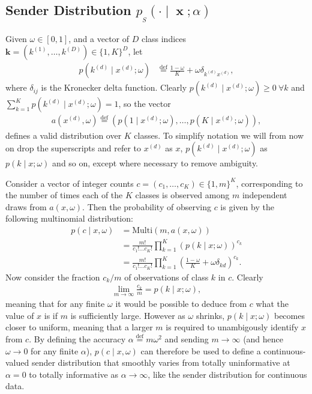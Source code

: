 \documentclass[11pt,table]{article}
\DeclareMathOperator{\x}{\mathbf{x}}
\renewcommand{\k}{\mathbf{k}}
\newcommand*{\defeq}{\stackrel{\text{def}}{=}}
\newcommand{\didx}[2]{#1^{(#2)}}
\newcommand{\0}[1]{\constvec{0}{#1}}
\newcommand{\1}[1]{\constvec{1}{#1}}
\newcommand{\ds}[1]{\{1,#1\}}
\newcommand{\dsd}[2]{\ds{#1}^{#2}}
\newcommand{\sender}[2]{p_{_S}\left(#1 \mid #2\right)}
\begin{document}
\subsection{Sender Distribution \texorpdfstring{$\sender{\cdot}{\x; \alpha}$}{}}\label{sec:disc_sender}
Given $\omega \in [0,1]$, and a vector of $D$ class indices $\k = \left(\didx{k}{1},\dots,\didx{k}{D}\right) \in \dsd{K}{D}$, let
\begin{align}
p(\didx{k}{d} \mid \didx{x}{d}; \omega) &\defeq \frac{1-\omega}{K} + \omega \delta_{\didx{k}{d} \didx{x}{d}}\label{q_def},
\end{align}
where $\delta_{i j}$ is the Kronecker delta function.
Clearly $p(\didx{k}{d} \mid \didx{x}{d}; \omega) \geq 0\ \forall k$ and $\sum_{k=1}^K p(\didx{k}{d} \mid \didx{x}{d}; \omega) = 1$, so the vector
\begin{align}
a(\didx{x}{d}, \omega) \defeq \left(p(1 \mid \didx{x}{d}; \omega),\dots,p(K \mid \didx{x}{d}; \omega)\right),
\end{align}
defines a valid distribution over $K$ classes.
To simplify notation we will from now on drop the superscripts and refer to $\didx{x}{d}$ as $x$, $p(\didx{k}{d} \mid \didx{x}{d}; \omega)$ as $p(k \mid x; \omega)$ and so on, except where necessary to remove ambiguity.

Consider a vector of integer counts $c = (c_1,\dots,c_K) \in \dsd{m}{K}$, corresponding to the number of times each of the $K$ classes is observed among $m$ independent draws from $a(x, \omega)$.
Then the probability of observing $c$ is given by the following multinomial distribution:
\begin{align}
p(c \mid x, \omega) &= \text{Multi}(m, a(x, \omega))\label{multi_def}\\
&= \frac{m!}{c_1!\dots c_K!} \prod_{k=1}^K \left(p(k \mid x; \omega)\right)^{c_k}\\
&= \frac{m!}{c_1!\dots c_K!} \prod_{k=1}^K \left(\frac{1-\omega}{K} + \omega\delta_{k d}\right)^{c_k}.\label{count_dist}
\end{align}
Now consider the fraction $c_k/m$ of observations of class $k$ in $c$.
Clearly
\begin{align}
\lim_{m\rightarrow \infty} \frac{c_k}{m} = p(k \mid x; \omega),
\end{align}
meaning that for any finite $\omega$ it would be possible to deduce from $c$ what the value of $x$ is if $m$ is sufficiently large.
However as $\omega$ shrinks, $p(k \mid x; \omega)$ becomes closer to uniform, meaning that a larger $m$ is required to unambigously identify $x$ from $c$. 
By defining the accuracy $\alpha \defeq m\omega^2$ and sending $m \rightarrow \infty$ (and hence $\omega \rightarrow 0$ for any finite $\alpha$), $p(c \mid x, \omega)$ can therefore be used to define a continuous-valued sender distribution that smoothly varies from totally uninformative at $\alpha=0$ to totally informative as $\alpha \rightarrow \infty$, like the sender distribution for continuous data.
\end{document}
